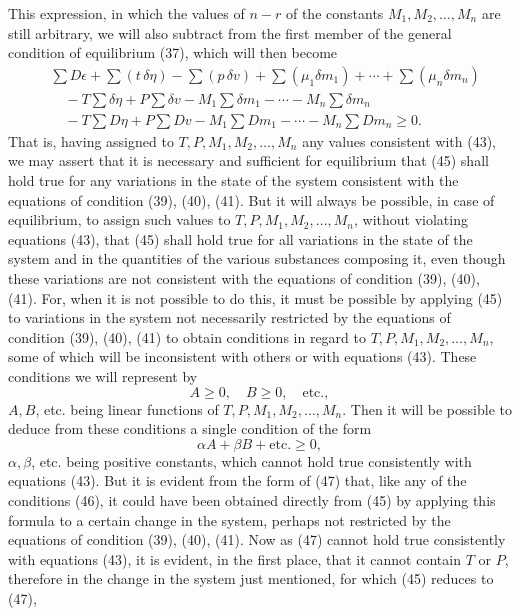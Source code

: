 \documentclass[11pt]{article}
\begin{document}
This expression, in which the values of \(n-r\) of the constants \(M_1,M_2,\ldots,M_n\) are still arbitrary, we will also subtract from the first member of the general condition of equilibrium (37), which will then become
\begin{equation}
\begin{aligned}
&\sum D\epsilon+\sum(t\,\delta\eta)-\sum(p\,\delta v)
+\sum(\mu_1\delta m_1)+\cdots+\sum(\mu_n\delta m_n)\\
&\quad
-T\sum\delta\eta+P\sum\delta v-M_1\sum\delta m_1-\cdots-M_n\sum\delta m_n\\
&\quad
-T\sum D\eta+P\sum Dv-M_1\sum Dm_1-\cdots-M_n\sum Dm_n
\geq 0.
\end{aligned}
\end{equation}
That is, having assigned to \(T,P,M_1,M_2,\ldots,M_n\) any values consistent with (43), we may assert that it is necessary and sufficient for equilibrium that (45) shall hold true for any variations in the state of the system consistent with the equations of condition (39), (40), (41). But it will always be possible, in case of equilibrium, to assign such values to \(T,P,M_1,M_2,\ldots,M_n\), without violating equations (43), that (45) shall hold true for all variations in the state of the system and in the quantities of the various substances composing it, even though these variations are not consistent with the equations of condition (39), (40), (41). For, when it is not possible to do this, it must be possible by applying (45) to variations in the system not necessarily restricted by the equations of condition (39), (40), (41) to obtain conditions in regard to \(T,P,M_1,M_2,\ldots,M_n\), some of which will be inconsistent with others or with equations (43). These conditions we will represent by
\begin{equation}
A\geq 0,\quad B\geq 0,\quad \text{etc.},
\end{equation}
\(A,B\), etc. being linear functions of \(T,P,M_1,M_2,\ldots,M_n\). Then it will be possible to deduce from these conditions a single condition of the form
\begin{equation}
\alpha A+\beta B+\text{etc.}\geq 0,
\end{equation}
\(\alpha,\beta\), etc. being positive constants, which cannot hold true consistently with equations (43). But it is evident from the form of (47) that, like any of the conditions (46), it could have been obtained directly from (45) by applying this formula to a certain change in the system, perhaps not restricted by the equations of condition (39), (40), (41). Now as (47) cannot hold true consistently with equations (43), it is evident, in the first place, that it cannot contain \(T\) or \(P\), therefore in the change in the system just mentioned, for which (45) reduces to (47),
\end{document}
